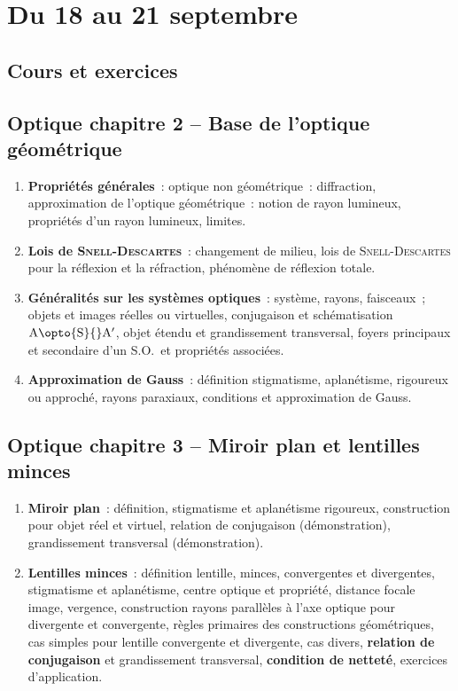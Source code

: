 \documentclass[a4paper, 12pt, final, garamond]{book}
\begin{document}
\setcounter{chapter}{0}

\chapter{Du 18 au 21 septembre}

\section{Cours et exercices}

\section*{Optique chapitre 2 -- Base de l'optique géométrique}
\begin{enumerate}[label=\Roman*]
	\item \textbf{Propriétés générales}~: optique non géométrique~: diffraction,
	      approximation de l'optique géométrique~: notion de rayon lumineux,
	      propriétés d'un rayon lumineux, limites.
	\item \textbf{Lois de \textsc{Snell-Descartes}}~: changement de milieu, lois
	      de \textsc{Snell-Descartes} pour la réflexion et la réfraction, phénomène
	      de réflexion totale.
	\item \textbf{Généralités sur les systèmes optiques}~: système, rayons,
	      faisceaux~; objets et images réelles ou virtuelles, conjugaison et
	      schématisation $\rm A \opto{\rm S}{}A'$, objet étendu et grandissement
	      transversal, foyers principaux et secondaire d'un S.O.\ et propriétés
	      associées.
	\item \textbf{Approximation de Gauss}~: définition stigmatisme, aplanétisme,
	      rigoureux ou approché, rayons paraxiaux, conditions et approximation de
	      Gauss.
\end{enumerate}

\section*{Optique chapitre 3 -- Miroir plan et lentilles minces}
\begin{enumerate}[label=\Roman*]
	\item \textbf{Miroir plan}~: définition, stigmatisme et aplanétisme
	      rigoureux, construction pour objet réel et virtuel, relation de
	      conjugaison (démonstration), grandissement transversal (démonstration).
	\item \textbf{Lentilles minces}~: définition lentille, minces, convergentes
	      et divergentes, stigmatisme et aplanétisme, centre optique et propriété,
	      distance focale image, vergence, construction rayons parallèles à l'axe
	      optique pour divergente et convergente, règles primaires des
	      constructions géométriques, cas simples pour lentille convergente et
	      divergente, cas divers, \textbf{relation de conjugaison} et
	      grandissement transversal, \textbf{condition de netteté}, exercices
	      d'application.
\end{enumerate}
\end{document}
